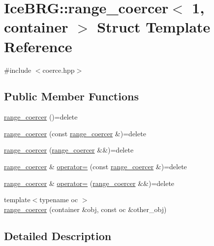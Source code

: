 \hypertarget{structIceBRG_1_1range__coercer_3_011_00_01container_01_4}{}\section{Ice\+B\+R\+G\+:\+:range\+\_\+coercer$<$ 1, container $>$ Struct Template Reference}
\label{structIceBRG_1_1range__coercer_3_011_00_01container_01_4}


{\ttfamily \#include $<$coerce.\+hpp$>$}

\subsection*{Public Member Functions}
\begin{DoxyCompactItemize}
\item 
\hyperlink{structIceBRG_1_1range__coercer_3_011_00_01container_01_4_acae861d0cb23f2d772fa859487fd148d}{range\+\_\+coercer} ()=delete
\item 
\hyperlink{structIceBRG_1_1range__coercer_3_011_00_01container_01_4_a08661cc84efad3abd42084e69ce947ff}{range\+\_\+coercer} (const \hyperlink{structIceBRG_1_1range__coercer}{range\+\_\+coercer} \&)=delete
\item 
\hyperlink{structIceBRG_1_1range__coercer_3_011_00_01container_01_4_a6dea5e8effe315edf3d20b405e528d14}{range\+\_\+coercer} (\hyperlink{structIceBRG_1_1range__coercer}{range\+\_\+coercer} \&\&)=delete
\item 
\hyperlink{structIceBRG_1_1range__coercer}{range\+\_\+coercer} \& \hyperlink{structIceBRG_1_1range__coercer_3_011_00_01container_01_4_a064183226a96efcfbc6a0c59fab2c0a0}{operator=} (const \hyperlink{structIceBRG_1_1range__coercer}{range\+\_\+coercer} \&)=delete
\item 
\hyperlink{structIceBRG_1_1range__coercer}{range\+\_\+coercer} \& \hyperlink{structIceBRG_1_1range__coercer_3_011_00_01container_01_4_a88f5dbc084c016c1208fe16997427ebd}{operator=} (\hyperlink{structIceBRG_1_1range__coercer}{range\+\_\+coercer} \&\&)=delete
\item 
{\footnotesize template$<$typename oc $>$ }\\\hyperlink{structIceBRG_1_1range__coercer_3_011_00_01container_01_4_aa782bb517500717633114e122d590054}{range\+\_\+coercer} (container \&obj, const oc \&other\+\_\+obj)
\end{DoxyCompactItemize}


\subsection{Detailed Description}
